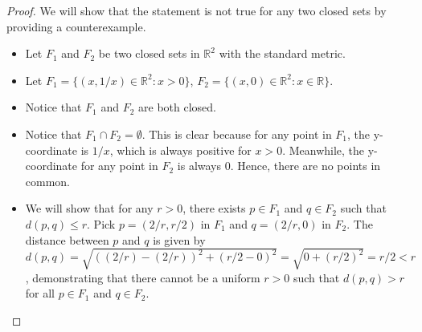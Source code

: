 \documentclass[10pt]{article}
\newenvironment{problem}[2][Problem]{\begin{trivlist}
\item[\hskip \labelsep {\bfseries #1}\hskip \labelsep {\bfseries #2.}]}{\end{trivlist}}
\begin{document}
\begin{problem}{4}
\begin{enumerate}
        \begin{proof}
            We will show that the statement is not true for any two closed sets by providing a counterexample.
            \begin{itemize}
                \item Let $F_1$ and $F_2$ be two closed sets in $\mathbb{R}^2$ with the standard metric.
                \item Let $F_1 = \{(x, 1/x) \in \mathbb{R}^2: x > 0\}$, $F_2 = \{(x, 0) \in \mathbb{R}^2 : x \in \mathbb{R}\}$.
                \item Notice that $F_1$ and $F_2$ are both closed. 
                \item Notice that $F_1 \cap F_2 = \emptyset$. This is clear because for any point in $F_1$, the y-coordinate is $1/x$, which is always positive for $x > 0$. Meanwhile, the y-coordinate for any point in $F_2$ is always 0. Hence, there are no points in common.
                \item We will show that for any $r > 0$, there exists $p \in F_1$ and $q \in F_2$ such that $d(p, q) \leq r$. Pick $p = (2/r, r/2)$ in $F_1$ and $q = (2/r, 0)$ in $F_2$. The distance between $p$ and $q$ is given by $d(p, q) = \sqrt{((2/r) - (2/r))^2 + (r/2 - 0)^2} = \sqrt{0 + (r/2)^2} = r/2 < r$, demonstrating that there cannot be a uniform $r > 0$ such that $d(p, q) > r$ for all $p \in F_1$ and $q \in F_2$.
            \end{itemize}
        \end{proof}

	\end{enumerate}
\end{problem}

\newpage
\end{document}
